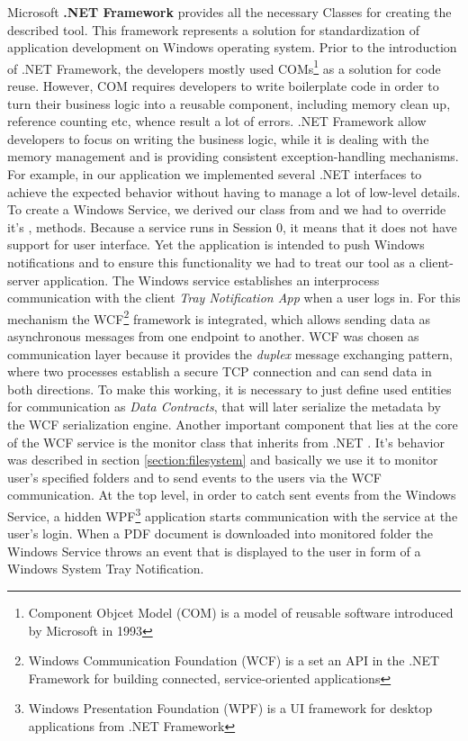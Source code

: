 Microsoft \textbf{.NET Framework} provides all the necessary Classes for creating the described tool. This framework represents a solution for standardization of application development on Windows operating system. Prior to the introduction of .NET Framework, the developers mostly used COMs\footnote{Component Objcet Model (COM) is a model of reusable software introduced by Microsoft in 1993} as a solution for code reuse. However, COM requires developers to write boilerplate code in order to turn their business logic into a reusable component, including memory clean up, reference counting etc, whence result a lot of errors. .NET Framework allow developers to focus on writing the business logic, while it is dealing with the memory management and is providing consistent exception-handling mechanisms. For example, in our application we implemented several .NET interfaces to achieve the expected behavior without having to manage a lot of low-level details. To create a Windows Service, we derived our class from  and we had to override it's ,  methods. Because a service runs in Session 0, it means that it does not have support for user interface. Yet the application is intended to push Windows notifications and to ensure this functionality we had to treat our tool as a client-server application. The Windows service establishes an interprocess communication with the client \textit{Tray Notification App} when a user logs in. For this mechanism the WCF\footnote{Windows Communication Foundation (WCF) is a set an API in the .NET Framework for building connected, service-oriented applications} framework is integrated, which allows sending data as asynchronous messages from one endpoint to another. WCF was chosen as communication layer because it provides the \textit{duplex} message exchanging pattern, where two processes establish a secure TCP connection and can send data in both directions. To make this working, it is necessary to just define used entities for communication as \textit{Data Contracts}, that will later serialize the metadata by the WCF serialization engine. Another important component that lies at the core of the WCF service is the monitor class that inherits from .NET . It's behavior was described in section \ref{section:filesystem} and basically we use it to monitor user's specified folders and to send events to the users via the WCF communication. At the top level, in order to catch sent events from the Windows Service, a hidden WPF\footnote{Windows Presentation Foundation (WPF) is a UI framework for desktop applications from .NET Framework} application starts communication with the service at the user's login. When a PDF document is downloaded into monitored folder the Windows Service throws an event that is displayed to the user in form of a Windows System Tray Notification.

